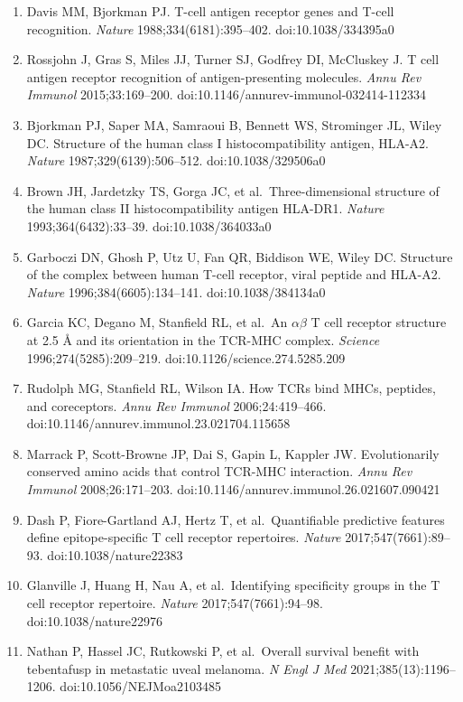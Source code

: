\documentclass[
  11pt,
]{article}
\providecommand{\tightlist}{%
  \setlength{\itemsep}{0pt}\setlength{\parskip}{0pt}}
\begin{document}
\begin{enumerate}
\def\labelenumi{\arabic{enumi}.}
\tightlist
\item
  Davis MM, Bjorkman PJ. T-cell antigen receptor genes and T-cell recognition. \emph{Nature} 1988;334(6181):395--402. doi:10.1038/334395a0
\item
  Rossjohn J, Gras S, Miles JJ, Turner SJ, Godfrey DI, McCluskey J. T cell antigen receptor recognition of antigen-presenting molecules. \emph{Annu Rev Immunol} 2015;33:169--200. doi:10.1146/annurev-immunol-032414-112334
\item
  Bjorkman PJ, Saper MA, Samraoui B, Bennett WS, Strominger JL, Wiley DC. Structure of the human class I histocompatibility antigen, HLA-A2. \emph{Nature} 1987;329(6139):506--512. doi:10.1038/329506a0
\item
  Brown JH, Jardetzky TS, Gorga JC, et al.~Three-dimensional structure of the human class II histocompatibility antigen HLA-DR1. \emph{Nature} 1993;364(6432):33--39. doi:10.1038/364033a0
\item
  Garboczi DN, Ghosh P, Utz U, Fan QR, Biddison WE, Wiley DC. Structure of the complex between human T-cell receptor, viral peptide and HLA-A2. \emph{Nature} 1996;384(6605):134--141. doi:10.1038/384134a0
\item
  Garcia KC, Degano M, Stanfield RL, et al.~An \ensuremath{\alpha}\ensuremath{\beta} T cell receptor structure at 2.5 \AA{} and its orientation in the TCR-MHC complex. \emph{Science} 1996;274(5285):209--219. doi:10.1126/science.274.5285.209
\item
  Rudolph MG, Stanfield RL, Wilson IA. How TCRs bind MHCs, peptides, and coreceptors. \emph{Annu Rev Immunol} 2006;24:419--466. doi:10.1146/annurev.immunol.23.021704.115658
\item
  Marrack P, Scott-Browne JP, Dai S, Gapin L, Kappler JW. Evolutionarily conserved amino acids that control TCR-MHC interaction. \emph{Annu Rev Immunol} 2008;26:171--203. doi:10.1146/annurev.immunol.26.021607.090421
\item
  Dash P, Fiore-Gartland AJ, Hertz T, et al.~Quantifiable predictive features define epitope-specific T cell receptor repertoires. \emph{Nature} 2017;547(7661):89--93. doi:10.1038/nature22383
\item
  Glanville J, Huang H, Nau A, et al.~Identifying specificity groups in the T cell receptor repertoire. \emph{Nature} 2017;547(7661):94--98. doi:10.1038/nature22976
\item
  Nathan P, Hassel JC, Rutkowski P, et al.~Overall survival benefit with tebentafusp in metastatic uveal melanoma. \emph{N Engl J Med} 2021;385(13):1196--1206. doi:10.1056/NEJMoa2103485

\end{enumerate}
\end{document}
